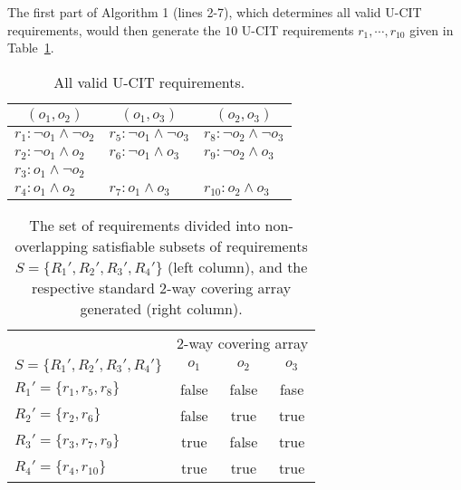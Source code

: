 \documentclass[EPiC]{easychair}
\begin{document}
The first part of Algorithm 1 (lines 2-7), which  determines all valid U-CIT requirements, would then generate the $10$ U-CIT requirements $r_1,  \cdots, r_{10}$ given in Table~\ref{tbl:requirements}.

\begin{table}[t]
\centering
\begin{tabular}{|l|l|l|}
\hline
\multicolumn{1}{|c}{$(o_1, o_2)$} & \multicolumn{1}{|c}{$(o_1, o_3)$} & \multicolumn{1}{|c|}{$(o_2, o_3)$} \\
\hline
\hline
$r_1: \neg o_1 \wedge \neg o_2$ & $r_5: \neg o_1 \wedge \neg o_3$  & $r_8: \neg o_2 \wedge \neg o_3$  \\
$r_2: \neg o_1 \wedge o_2$ & $r_6: \neg o_1 \wedge o_3$  & $r_9: \neg o_2 \wedge o_3$  \\
$r_3: o_1 \wedge \neg o_2$ &  &    \\
$r_4: o_1 \wedge o_2$ & $r_7: o_1 \wedge o_3$  & $r_{10}: o_2 \wedge o_3$ \\
\hline
\end{tabular}
\caption{All valid U-CIT requirements.}
\label{tbl:requirements}
\end{table}

\begin{table}[h]
\centering
\begin{tabular}{|l|ccc|} 
\hline
     & \multicolumn{3}{c|}{$2$-way covering array} \\ 
\multicolumn{1}{|c|}{$S = \{R_1', R_2', R_3', R_4'\}$} & $o_1$ & $o_2$ & $o_3$ \\ 
\hline
\hline
$R_1' = \{r_1, r_5, r_8 \}$  & false & false & fase \\
$R_2' = \{r_2, r_6\}$        & false & true  & true \\
$R_3' = \{r_3, r_7, r_9 \}$  & true  & false & true \\
$R_4' = \{r_4, r_{10} \}$    & true  & true  & true \\
\hline
\end{tabular}
\caption{The set of requirements divided into non-overlapping satisfiable subsets of requirements $S=\{R_1', R_2', R_3', R_4'\}$ (left column), and the respective standard $2$-way covering array generated (right column).}
\label{tbl:output}
\end{table}
\end{document}
